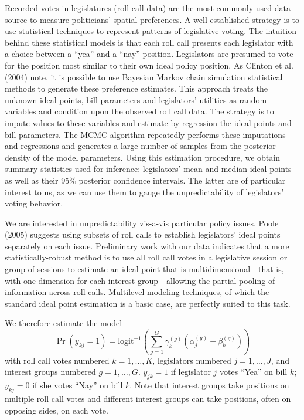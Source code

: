 \documentclass[12pt]{article}
\newcommand{\ga}{\gamma}
\begin{document}
Recorded votes in legislatures (roll call data) are the most commonly used data source to measure politicians' spatial preferences. A well-established strategy is to use statistical techniques to represent patterns of legislative voting. The intuition behind these statistical models is that each roll call presents each legislator with a choice between a ``yea'' and a ``nay'' position. Legislators are presumed to vote for the position most similar to their own ideal policy position. As Clinton et al. (2004) note, it is possible to use Bayesian Markov chain simulation statistical methods to generate these preference estimates. This approach treats the unknown ideal points, bill parameters and legislators' utilities as random variables and condition upon the observed roll call data. The strategy is to impute values to these variables and estimate by regression the ideal points and bill parameters. The MCMC algorithm repeatedly performs these imputations and regressions and generates a large number of samples from the posterior density of the model parameters. Using this estimation procedure, we obtain summary statistics used for inference: legislators' mean and median ideal points as well as their 95$\%$ posterior confidence intervals. The latter are of particular interest to us, as we can use them to gauge the unpredictability of  legislators' voting behavior.

We are interested in unpredictability vis-a-vis particular policy issues. Poole (2005) suggests using subsets of roll calls to establish legislators' ideal points separately on each issue. Preliminary work with our data indicates that a more statistically-robust method is to use all roll call votes in a legislative session or group of sessions to estimate an ideal point that is multidimensional---that is, with one dimension for each interest group---allowing the partial pooling of information across roll calls. Multilevel modeling techniques, of which the standard ideal point estimation is a basic case, are perfectly suited to this task.

We therefore estimate the model
\begin{equation}
  \Pr(y_{kj} = 1) = \text{logit}^{-1}\left( \sum_{g=1}^G \ga_k^{(g)}\left( \alpha_j^{(g)} - \beta_k^{(g)}\right) \right)
	\label{eq:v2}
\end{equation}
with roll call votes numbered $k=1,\ldots,K$, legislators numbered $j=1,\dots,J$, and interest groups numbered $g=1,\dots,G$. $y_{jk}=1$ if legislator $j$ votes ``Yea'' on bill $k$; $y_{kj}=0$ if she votes ``Nay'' on bill $k$. Note that interest groups take positions on multiple roll call votes and different interest groups can take positions, often on opposing sides, on each vote.
		
\end{document}
